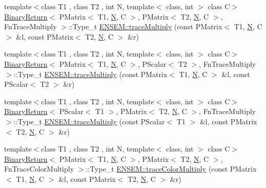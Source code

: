 \begin{DoxyCompactItemize}
\item 
{\footnotesize template$<$class T1 , class T2 , int N, template$<$ class, int $>$ class C$>$ }\\\mbox{\hyperlink{structBinaryReturn}{Binary\+Return}}$<$ P\+Matrix$<$ T1, \mbox{\hyperlink{adat__devel_2lib_2hadron_2operator__name__util_8cc_a7722c8ecbb62d99aee7ce68b1752f337}{N}}, C $>$, P\+Matrix$<$ T2, \mbox{\hyperlink{adat__devel_2lib_2hadron_2operator__name__util_8cc_a7722c8ecbb62d99aee7ce68b1752f337}{N}}, C $>$, Fn\+Trace\+Multiply $>$\+::Type\+\_\+t \mbox{\hyperlink{group__primmatrix_ga91e09af0f8d2d70627950b973f6b41ec}{E\+N\+S\+E\+M\+::trace\+Multiply}} (const P\+Matrix$<$ T1, \mbox{\hyperlink{adat__devel_2lib_2hadron_2operator__name__util_8cc_a7722c8ecbb62d99aee7ce68b1752f337}{N}}, C $>$ \&l, const P\+Matrix$<$ T2, \mbox{\hyperlink{adat__devel_2lib_2hadron_2operator__name__util_8cc_a7722c8ecbb62d99aee7ce68b1752f337}{N}}, C $>$ \&r)
\item 
{\footnotesize template$<$class T1 , class T2 , int N, template$<$ class, int $>$ class C$>$ }\\\mbox{\hyperlink{structBinaryReturn}{Binary\+Return}}$<$ P\+Matrix$<$ T1, \mbox{\hyperlink{adat__devel_2lib_2hadron_2operator__name__util_8cc_a7722c8ecbb62d99aee7ce68b1752f337}{N}}, C $>$, P\+Scalar$<$ T2 $>$, Fn\+Trace\+Multiply $>$\+::Type\+\_\+t \mbox{\hyperlink{group__primmatrix_gac4a39563bd9c9b587bd894f97f9e3fc4}{E\+N\+S\+E\+M\+::trace\+Multiply}} (const P\+Matrix$<$ T1, \mbox{\hyperlink{adat__devel_2lib_2hadron_2operator__name__util_8cc_a7722c8ecbb62d99aee7ce68b1752f337}{N}}, C $>$ \&l, const P\+Scalar$<$ T2 $>$ \&r)
\item 
{\footnotesize template$<$class T1 , class T2 , int N, template$<$ class, int $>$ class C$>$ }\\\mbox{\hyperlink{structBinaryReturn}{Binary\+Return}}$<$ P\+Scalar$<$ T1 $>$, P\+Matrix$<$ T2, \mbox{\hyperlink{adat__devel_2lib_2hadron_2operator__name__util_8cc_a7722c8ecbb62d99aee7ce68b1752f337}{N}}, C $>$, Fn\+Trace\+Multiply $>$\+::Type\+\_\+t \mbox{\hyperlink{group__primmatrix_ga5b0cf4c87cad1bfd7dcad0a42d0b4ae6}{E\+N\+S\+E\+M\+::trace\+Multiply}} (const P\+Scalar$<$ T1 $>$ \&l, const P\+Matrix$<$ T2, \mbox{\hyperlink{adat__devel_2lib_2hadron_2operator__name__util_8cc_a7722c8ecbb62d99aee7ce68b1752f337}{N}}, C $>$ \&r)
\item 
{\footnotesize template$<$class T1 , class T2 , int N, template$<$ class, int $>$ class C$>$ }\\\mbox{\hyperlink{structBinaryReturn}{Binary\+Return}}$<$ P\+Matrix$<$ T1, \mbox{\hyperlink{adat__devel_2lib_2hadron_2operator__name__util_8cc_a7722c8ecbb62d99aee7ce68b1752f337}{N}}, C $>$, P\+Matrix$<$ T2, \mbox{\hyperlink{adat__devel_2lib_2hadron_2operator__name__util_8cc_a7722c8ecbb62d99aee7ce68b1752f337}{N}}, C $>$, Fn\+Trace\+Color\+Multiply $>$\+::Type\+\_\+t \mbox{\hyperlink{group__primmatrix_ga017dba078c2a41f5ca2a8d2b934b20aa}{E\+N\+S\+E\+M\+::trace\+Color\+Multiply}} (const P\+Matrix$<$ T1, \mbox{\hyperlink{adat__devel_2lib_2hadron_2operator__name__util_8cc_a7722c8ecbb62d99aee7ce68b1752f337}{N}}, C $>$ \&l, const P\+Matrix$<$ T2, \mbox{\hyperlink{adat__devel_2lib_2hadron_2operator__name__util_8cc_a7722c8ecbb62d99aee7ce68b1752f337}{N}}, C $>$ \&r)

\end{DoxyCompactItemize}
